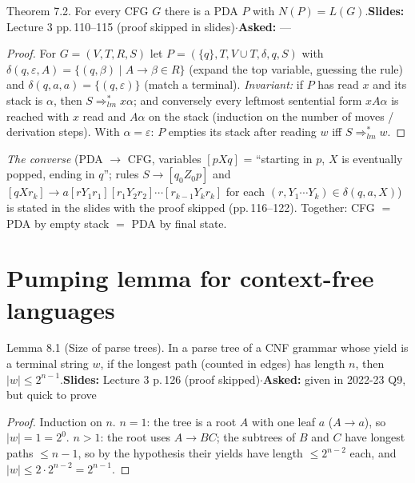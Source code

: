 \documentclass[10.5pt,a4paper]{article}
\newcommand{\src}[2]{{\footnotesize\color{gray!70!black}\textbf{Slides:} #1\enspace$\cdot$\enspace\textbf{Asked:} #2}\par}
\newcommand{\eps}{\varepsilon}
\begin{document}
\begin{thm}{Theorem 7.2. For every CFG $G$ there is a PDA $P$ with $N(P)=L(G)$.}\src{Lecture 3 pp.\,110--115 (proof skipped in slides)}{---}\end{thm}
\begin{proof}
For $G=(V,T,R,S)$ let $P=(\{q\},T,V\cup T,\delta,q,S)$ with $\delta(q,\eps,A)=\{(q,\beta)\mid A\to\beta\in R\}$ (expand the top variable,
guessing the rule) and $\delta(q,a,a)=\{(q,\eps)\}$ (match a terminal). \emph{Invariant:} if $P$ has read $x$ and its stack is $\alpha$, then
$S\Rightarrow^*_{lm}x\alpha$; and conversely every leftmost sentential form $xA\alpha$ is reached with $x$ read and $A\alpha$ on the stack
(induction on the number of moves / derivation steps). With $\alpha=\eps$: $P$ empties its stack after reading $w$ iff $S\Rightarrow^*_{lm}w$.
\end{proof}
\emph{The converse} (PDA $\to$ CFG, variables $[pXq]$ = ``starting in $p$, $X$ is eventually popped, ending in $q$''; rules
$S\to[q_0Z_0p]$ and $[qXr_k]\to a[rY_1r_1][r_1Y_2r_2]\cdots[r_{k-1}Y_kr_k]$ for each $(r,Y_1\cdots Y_k)\in\delta(q,a,X)$) is stated in the slides
with the proof skipped (pp.\,116--122). Together: CFG $=$ PDA by empty stack $=$ PDA by final state.

\section{Pumping lemma for context-free languages}

\begin{thm}{Lemma 8.1 (Size of parse trees). In a parse tree of a CNF grammar whose yield is a terminal string $w$, if the longest path
(counted in edges) has length $n$, then $|w|\le2^{n-1}$.}\src{Lecture 3 p.\,126 (proof skipped)}{given in 2022-23 Q9, but quick to prove}\end{thm}
\begin{proof}
Induction on $n$. $n=1$: the tree is a root $A$ with one leaf $a$ ($A\to a$), so $|w|=1=2^0$. $n>1$: the root uses $A\to BC$; the subtrees
of $B$ and $C$ have longest paths $\le n-1$, so by the hypothesis their yields have length $\le2^{n-2}$ each, and
$|w|\le2\cdot2^{n-2}=2^{n-1}$.
\end{proof}
\end{document}
